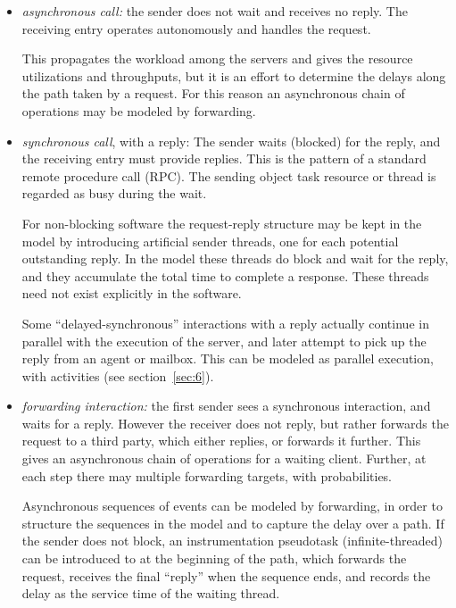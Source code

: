 \documentclass[11pt]{article}
\begin{document}
\begin{itemize}
\item \emph{asynchronous call:} the sender does not wait and receives no
  reply. The receiving entry operates autonomously and handles the
  request. 

  This propagates the workload among the servers and gives the resource utilizations and
  throughputs, but it is an effort to determine the delays along the path taken by a request. For this
  reason an asynchronous chain of operations may be modeled by forwarding.

\item \emph{synchronous call}, with a reply: The sender waits
  (blocked) for the reply, and the receiving entry must provide
  replies. This is the pattern of a standard remote procedure call
  (RPC). The sending object task resource or thread is regarded as
  busy during the wait.
  
  For non-blocking software the request-reply structure may be kept in the model by introducing
  artificial sender threads, one for each potential outstanding reply. In the model these threads do
  block and wait for the reply, and they accumulate the total time to complete a response. These
  threads need not exist explicitly in the software.

  Some ``delayed-synchronous'' interactions with a reply actually continue in parallel with the
  execution of the server, and later attempt to pick up the reply from an agent or mailbox. This can
  be modeled as parallel execution, with activities (see section~\ref{sec:6}).

\item \emph{forwarding interaction:} the first sender sees a synchronous
  interaction, and waits for a reply. However the receiver does not
  reply, but rather forwards the request to a third party, which
  either replies, or forwards it further. This gives an asynchronous
  chain of operations for a waiting client.  Further, at each step there may multiple forwarding targets, with probabilities.

  Asynchronous sequences of events can be modeled by forwarding, in order to structure the
  sequences in the model and to capture the delay over a path. If the sender does not block, an
  instrumentation pseudotask (infinite-threaded) can be introduced to at the beginning of the path,
  which forwards the request, receives the final ``reply'' when the sequence ends, and records the
  delay as the service time of the waiting thread.
\end{itemize}
\end{document}
